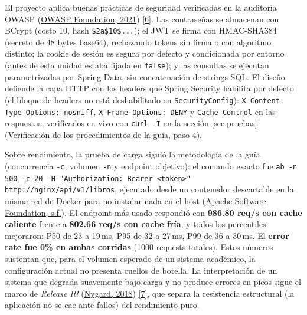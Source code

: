\documentclass[12pt,a4paper]{article}
\begin{document}
El proyecto aplica buenas prácticas de seguridad verificadas en la auditoría OWASP
(\hyperlink{ref:owasp}{OWASP Foundation, 2021}) \hyperlink{ieee6}{[6]}. Las contraseñas se almacenan con BCrypt (costo 10, hash
\texttt{\$2a\$10\$...}); el JWT se firma con HMAC-SHA384 (secreto de 48 bytes base64),
rechazando tokens sin firma o con algoritmo distinto; la cookie de sesión es segura por
defecto y condicionada por entorno (antes de esta unidad estaba fijada en
\texttt{false}); y las consultas se ejecutan parametrizadas por Spring Data, sin
concatenación de strings SQL. El diseño defiende la capa HTTP con los headers que Spring
Security habilita por defecto (el bloque de headers no está deshabilitado en
\texttt{SecurityConfig}): \texttt{X-Content-Type-Options: nosniff},
\texttt{X-Frame-Options: DENY} y \texttt{Cache-Control} en las respuestas, verificados en
vivo con \texttt{curl -I} en la sección \ref{sec:pruebas} (Verificación de los
procedimientos de la guía, paso 4).

Sobre rendimiento, la prueba de carga siguió la metodología de la guía (concurrencia
\texttt{-c}, volumen \texttt{-n} y endpoint objetivo): el comando exacto fue
\texttt{ab -n 500 -c 20 -H "Authorization: Bearer <token>" http://nginx/api/v1/libros},
ejecutado desde un contenedor descartable en la misma red de Docker para no instalar nada
en el host (\hyperlink{ref:apache}{Apache Software Foundation, s.f.}). El endpoint más usado respondió con
\textbf{986.80 req/s con cache caliente} frente a \textbf{802.66 req/s con cache fría}, y
todos los percentiles mejoraron: P50 de 23 a 19\,ms, P95 de 32 a 27\,ms, P99 de 36 a
30\,ms. El \textbf{error rate fue 0\% en ambas corridas} (1000 requests totales). Estos
números sustentan que, para el volumen esperado de un sistema académico, la configuración
actual no presenta cuellos de botella. La interpretación de un sistema que degrada
suavemente bajo carga y no produce errores en picos sigue el marco de \textit{Release
It!} (\hyperlink{ref:nygard}{Nygard, 2018}) \hyperlink{ieee7}{[7]}, que separa la resistencia estructural (la aplicación no se cae ante
fallos) del rendimiento puro.
\end{document}
